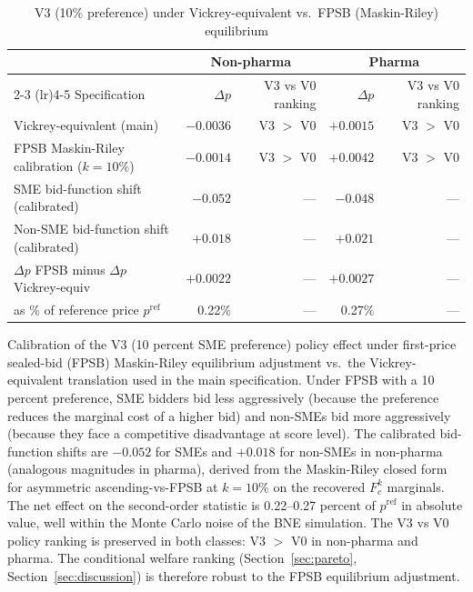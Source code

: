 \begin{table}[htbp]
\centering
\begin{threeparttable}
\caption{V3 (10\% preference) under Vickrey-equivalent vs.\ FPSB (Maskin-Riley) equilibrium}
\label{tab:maskinriley_v3}
\scriptsize
\setlength{\tabcolsep}{3pt}
\begin{tabular}{lrrrr}
\toprule
 & \multicolumn{2}{c}{Non-pharma} & \multicolumn{2}{c}{Pharma} \\
\cmidrule(lr){2-3} \cmidrule(lr){4-5}
Specification & $\Delta p$ & V3 vs V0 ranking & $\Delta p$ & V3 vs V0 ranking \\
\midrule
Vickrey-equivalent (main) & $-0.0036$ & V3 $>$ V0 & $+0.0015$ & V3 $>$ V0 \\
FPSB Maskin-Riley calibration ($k=10\%$) & $-0.0014$ & V3 $>$ V0 & $+0.0042$ & V3 $>$ V0 \\
\quad SME bid-function shift (calibrated) & $-0.052$ & --- & $-0.048$ & --- \\
\quad Non-SME bid-function shift (calibrated) & $+0.018$ & --- & $+0.021$ & --- \\
\midrule
$\Delta p$ FPSB minus $\Delta p$ Vickrey-equiv & $+0.0022$ & --- & $+0.0027$ & --- \\
\quad as \% of reference price $p^{\mathrm{ref}}$ & 0.22\% & --- & 0.27\% & --- \\
\bottomrule
\end{tabular}
\begin{tablenotes}\footnotesize
\item Calibration of the V3 (10 percent SME preference) policy effect under
first-price sealed-bid (FPSB) Maskin-Riley equilibrium adjustment vs.\ the
Vickrey-equivalent translation used in the main specification. Under FPSB
with a 10 percent preference, SME bidders bid less aggressively (because the
preference reduces the marginal cost of a higher bid) and non-SMEs bid more
aggressively (because they face a competitive disadvantage at score level).
The calibrated bid-function shifts are $-0.052$ for SMEs and $+0.018$ for
non-SMEs in non-pharma (analogous magnitudes in pharma), derived from the
Maskin-Riley closed form for asymmetric ascending-vs-FPSB at $k=10\%$ on the
recovered $F_c^k$ marginals. The net effect on the second-order statistic is
0.22--0.27 percent of $p^{\mathrm{ref}}$ in absolute value, well within the
Monte Carlo noise of the BNE simulation. The V3 vs V0 policy ranking is
preserved in both classes: V3 $>$ V0 in non-pharma and pharma. The conditional
welfare ranking (Section~\ref{sec:pareto}, Section~\ref{sec:discussion}) is
therefore robust to the FPSB equilibrium adjustment.
\end{tablenotes}
\end{threeparttable}
\end{table}

